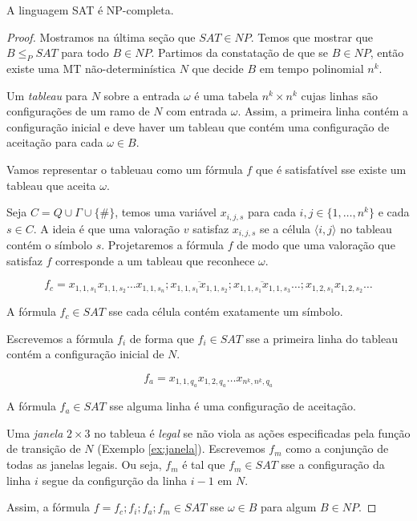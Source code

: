 \begin{theorem}
A linguagem SAT é NP-completa.
\end{theorem}
\begin{proof}

  
  Mostramos na última seção que $SAT \in NP$.
  Temos que mostrar que $B \leq_P SAT$ para todo $B \in NP$.
  Partimos da constatação de que se $B \in NP$, então existe uma MT não-determinística $N$ que decide $B$ em tempo polinomial $n^k$.

  Um {\em tableau} para $N$ sobre a entrada $\omega$ é uma tabela $n^k \times n^k$ cujas linhas são configurações de um ramo de $N$ com entrada $\omega$.
  Assim, a primeira linha contém a configuração inicial e deve haver um tableau que contém uma configuração de aceitação para cada $\omega \in B$.


  Vamos representar o tableuau como um fórmula $f$ que é satisfatível sse existe um tableau que aceita $\omega$.

  Seja $C = Q \cup \Gamma \cup \{\#\}$, temos uma variável $x_{i,j,s}$ para cada $i,j \in \{1, \dots, n^k\}$ e cada $s \in C$.
  A ideia é que uma valoração $v$ satisfaz $x_{i,j,s}$ se a célula $\langle i, j \rangle$ no tableau contém o símbolo $s$.
  Projetaremos a fórmula $f$ de modo que uma valoração que satisfaz $f$ corresponde a um tableau que reconhece $\omega$.

  \begin{displaymath}
    f_c = x_{1,1,s_1}x_{1,1,s_2} \dots x_{1,1,s_n}; \overline{x_{1,1,s_1}x_{1,1,s_2}}; \overline{x_{1,1,s_1}x_{1,1,s_3}} \dots; x_{1,2,s_1}x_{1,2,s_2} \dots
  \end{displaymath}

  A fórmula $f_c \in SAT$ sse cada célula contém exatamente um símbolo.

  Escrevemos a fórmula $f_i$ de forma que $f_i \in SAT$ sse a primeira linha do tableau contém a configuração inicial de $N$.

  \begin{displaymath}
    f_a = x_{1,1,q_a}x_{1,2,q_a} \dots x_{n^k,n^k, q_a}
  \end{displaymath}

  A fórmula $f_a \in SAT$ sse alguma linha é uma configuração de aceitação.

  Uma {\em janela} $2 \times 3$ no tableua é {\em legal} se não viola as ações especificadas pela função de transição de $N$ (Exemplo \ref{ex:janela}).
  Escrevemos $f_m$ como a conjunção de todas as janelas legais.
  Ou seja, $f_m$ é tal que $f_m \in SAT$ sse a configuração da linha $i$ segue da configurção da linha $i-1$ em $N$.

  Assim, a fórmula $f = f_c;f_i;f_a;f_m \in SAT$ sse $\omega \in B$ para algum $B \in NP$.
\end{proof}

